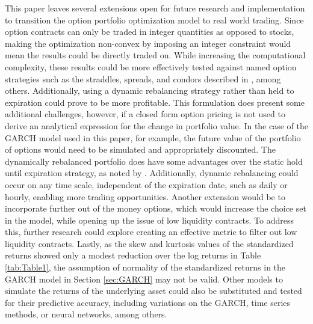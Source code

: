 This paper leaves several extensions open for future research and implementation to transition the option portfolio optimization model to real world trading. Since option contracts can only be traded in integer quantities as opposed to stocks, making the optimization non-convex by imposing an integer constraint would mean the results could be directly traded on. While increasing the computational complexity, these results could be more effectively tested against named option strategies such as the straddles, spreads, and condors described in \cite{chaput2003option}, among others. Additionally, using a dynamic rebalancing strategy rather than held to expiration could prove to be more profitable. This formulation does present some additional challenges, however, if a closed form option pricing is not used to derive an analytical expression for the change in portfolio value. In the case of the GARCH model used in this paper, for example, the future value of the portfolio of options would need to be simulated and appropriately discounted. The dynamically rebalanced portfolio does have some advantages over the static hold until expiration strategy, as noted by \cite{zhao2018markowitz}. Additionally, dynamic rebalancing could occur on any time scale, independent of the expiration date, such as daily or hourly, enabling more trading opportunities. Another extension would be to incorporate further out of the money options, which would increase the choice set in the model, while opening up the issue of low liquidity contracts. To address this, further research could explore creating an effective metric to filter out low liquidity contracts. Lastly, as the skew and kurtosis values of the standardized returns showed only a modest reduction over the log returns in Table \ref{tab:Table1}, the assumption of normality of the standardized returns in the GARCH model in Section \ref{sec:GARCH} may not be valid. Other models to simulate the returns of the underlying asset could also be substituted and tested for their predictive accuracy, including variations on the GARCH, time series methods, or neural networks, among others. 

\clearpage

\nocite{*}


\clearpage

